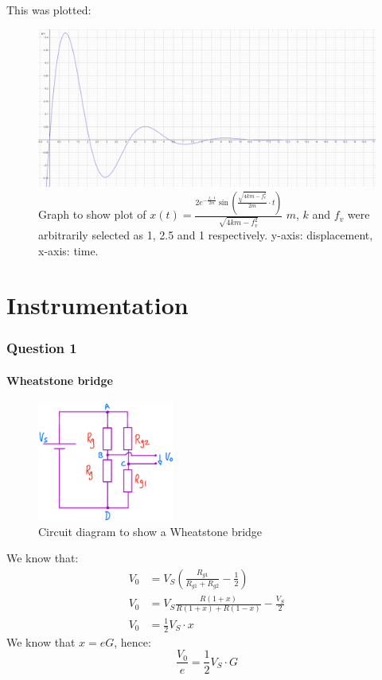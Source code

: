 \documentclass[12pt]{article}
\numberwithin{equation}{section}
\begin{document}
This was plotted:
\begin{figure}[H]
  \centering
  \includegraphics[width=\textwidth]{./img/3-2timeresponsedamped.png}
  \caption{Graph to show plot of $x(t) = \frac{2e^{-\frac{f_v \cdot t}{2m}}\sin{\left(\frac{\sqrt{4km-f_v^2 }}{2m} \cdot t\right)}}{\sqrt{4km - f_v^2}}$ $m$, $k$ and $f_v$ were arbitrarily selected as 1, 2.5 and 1 respectively. y-axis: displacement, x-axis: time.}
\end{figure}
\part{Instrumentation}
\section{Question 1}
\subsection*{Wheatstone bridge}
\begin{figure}[H]
  \centering
  \includegraphics[width=0.4\textwidth]{./img/4-1circuit.png}
  \caption{Circuit diagram to show a Wheatstone bridge}
\end{figure}
We know that:
\begin{align}
  V_0 &= V_S \left( \frac{R_{g1}}{R_{g1} + R_{g2}} - \frac{1}{2} \right)\\
  V_0 &= V_S \frac{R(1+x)}{R(1+x) + R(1-x)} - \frac{V_S}{2}\\
  V_0 &= \frac{1}{2} V_S \cdot x
\end{align}
We know that $x = eG$, hence:
\begin{equation}
  \frac{V_0}{e} = \frac{1}{2}V_S \cdot G
\end{equation}
\end{document}
